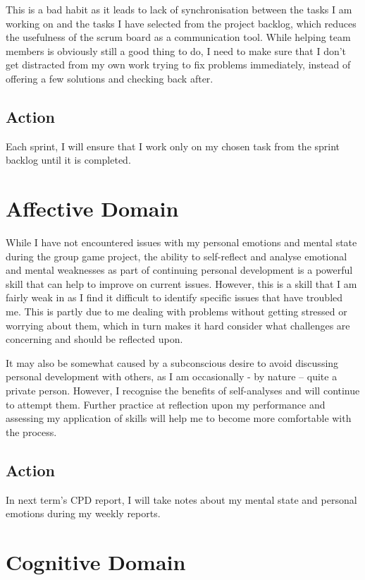 \documentclass{scrartcl}
\begin{document}
This is a bad habit as it leads to lack of synchronisation between the tasks I am working on and the tasks I have selected from the project backlog, which reduces the usefulness of the scrum board as a communication tool. While helping team members is obviously still a good thing to do, I need to make sure that I don’t get distracted from my own work trying to fix problems immediately, instead of offering a few solutions and checking back after.


\subsection{Action} 

Each sprint, I will ensure that I work only on my chosen task from the sprint backlog until it is completed.


\section{Affective Domain}

While I have not encountered issues with my personal emotions and mental state during the group game project, the ability to self-reflect and analyse emotional and mental weaknesses as part of continuing personal development is a powerful skill that can help to improve on current issues. However, this is a skill that I am fairly weak in as I find it difficult to identify specific issues that have troubled me. This is partly due to me dealing with problems without getting stressed or worrying about them, which in turn makes it hard consider what challenges are concerning and should be reflected upon.

It may also be somewhat caused by a subconscious desire to avoid discussing personal development with others, as I am occasionally - by nature – quite a private person. However, I recognise the benefits of self-analyses and will continue to attempt them. Further practice at reflection upon my performance and assessing my application of skills will help me to become more comfortable with the process. 


\subsection{Action} 

In next term's CPD report, I will take notes about my mental state and personal emotions during my weekly reports.


\section{Cognitive Domain}
\end{document}
